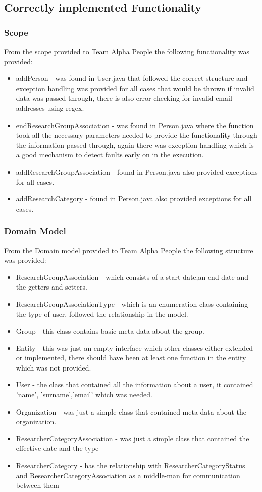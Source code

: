 \documentclass{article}
\begin{document}
	\subsection{Correctly implemented Functionality}
	\subsubsection{Scope}
	From the scope provided to Team Alpha People the following functionality was provided:
	\begin{itemize}
		\item addPerson - was found in User.java that followed the correct structure and exception handling was provided for all cases that would be thrown if invalid data was passed through, there is also error checking for invalid email addresses using regex.
		\item endResearchGroupAssociation - was found in Person.java where the function took all the necessary parameters needed to provide the functionality through the information passed through, again there was exception handling which is a good mechanism to detect faults early on in the execution.
		\item addResearchGroupAssociation - found in Person.java also provided exceptions for all cases.
		\item addResearchCategory - found in Person.java also provided exceptions for all cases.
		
	\end{itemize}
	
	\subsubsection{Domain Model}
	From the Domain model provided to Team Alpha People the following structure was provided:
	\begin{itemize}
	 \item ResearchGroupAssociation - which consists of a start date,an end date and the getters and setters.
	 \item ResearchGroupAssociationType - which is an enumeration class containing the type of user, followed the relationship in the model.
	 \item Group - this class contains basic meta data about the group.
	 \item Entity - this was just an empty interface which other classes either extended or implemented, there should have been at least one function in the entity which was not provided.
	 \item User - the class that contained all the information about a user, it contained 'name', 'surname','email' which was needed.
	 \item Organization - was just a simple class that contained meta data about the organization.
	 \item ResearcherCategoryAssociation - was just a simple class that contained the effective date and the type
	 \item ResearcherCategory - has the relationship with ResearcherCategoryStatus and ResearcherCategoryAssociation as a middle-man for communication between them
	 
	\end{itemize}
\end{document}
